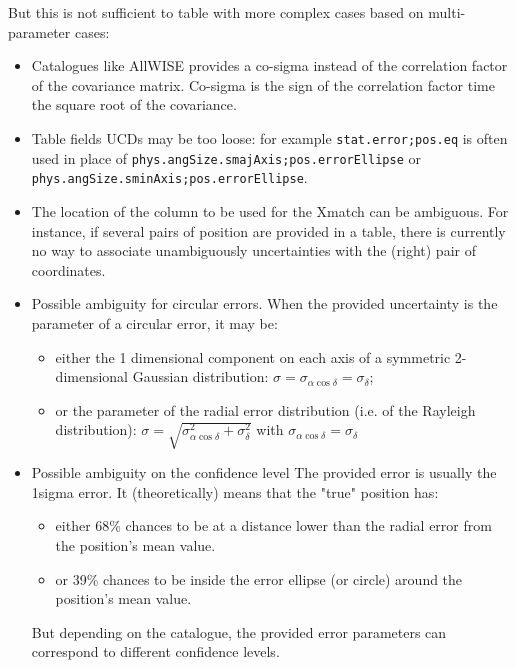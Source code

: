 \documentclass[11pt,a4paper]{ivoa}
\begin{document}
But this is not sufficient to table with more complex cases based on multi-parameter cases:

\begin{itemize}
	\item Catalogues like AllWISE provides a co-sigma instead of the correlation factor of the covariance matrix.
	Co-sigma is the sign of the correlation factor time the square root of the covariance.
	\item Table fields UCDs  may be too loose: for example  \texttt{stat.error;pos.eq} is often used in place of \texttt{phys.angSize.smajAxis;pos.errorEllipse} or \texttt{phys.angSize.sminAxis;pos.errorEllipse}.
	\item The location  of the column to be used for the Xmatch can be ambiguous. For instance, if several pairs of position are provided in a table, there is currently
	no way to associate unambiguously uncertainties with the (right) pair of coordinates.
	\item  Possible ambiguity for circular errors. When the provided uncertainty is the parameter of a circular error, it may be:
	\begin{itemize}
		\item either the 1 dimensional component on each axis of a symmetric 2-dimensional Gaussian distribution: $\sigma=\sigma_{\alpha\cos\delta}=\sigma_\delta$;
		\item or the parameter of the radial error distribution (i.e. of the Rayleigh distribution): $\sigma=\sqrt{\sigma_{\alpha\cos\delta}^2 + \sigma_\delta^2}$
                 with $\sigma_{\alpha\cos\delta} = \sigma_\delta$
         \end{itemize}

	\item   Possible ambiguity on the confidence level
	The provided error is usually the 1sigma error.
	It (theoretically) means that the "true" position has:
	\begin{itemize}
		\item either 68\% chances to be at a distance lower than the radial error from the position's mean value.
		\item or 39\% chances to be inside the error ellipse (or circle) around the position's mean value.
	\end{itemize}
	But depending on the catalogue, the provided error parameters can correspond to different confidence levels.

\end{itemize}
\end{document}
